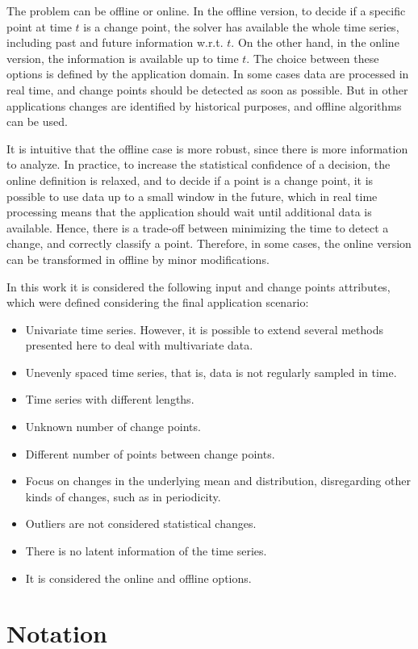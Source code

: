 The problem can be offline or online. In the offline version, to decide if a
specific point at time $t$ is a change point, the solver has available the
whole time series, including past and future information w.r.t. $t$. On the
other hand, in the online version, the information is available up to time $t$.
The choice between these options is defined by the application domain. In some
cases data are processed in real time, and change points should be detected as
soon as possible. But in other applications changes are identified by historical
purposes, and offline algorithms can be used.

It is intuitive that the offline case is more robust, since there is more
information to analyze. In practice, to increase the statistical confidence of
a decision, the online definition is relaxed, and to decide if a point
is a change point, it is possible to use data up to a small window in the future,
which in real time processing means that the application should wait until
additional data is available. Hence, there is a trade-off between minimizing
the time to detect a change, and correctly classify a point. Therefore, in some
cases, the online version can be transformed in offline by minor modifications.

In this work it is considered the following input and change points attributes,
which were defined considering the final application scenario:
\begin{itemize}
\item Univariate time series. However, it is possible to extend several
    methods presented here to deal with multivariate data.
\item Unevenly spaced time series, that is, data is not regularly sampled in
    time.
\item Time series with different lengths.
\item Unknown number of change points.
\item Different number of points between change points.
\item Focus on changes in the underlying mean and distribution, disregarding
    other kinds of changes, such as in periodicity.
\item Outliers are not considered statistical changes.
\item There is no latent information of the time series.
\item It is considered the online and offline options.
\end{itemize}

\section{Notation}

